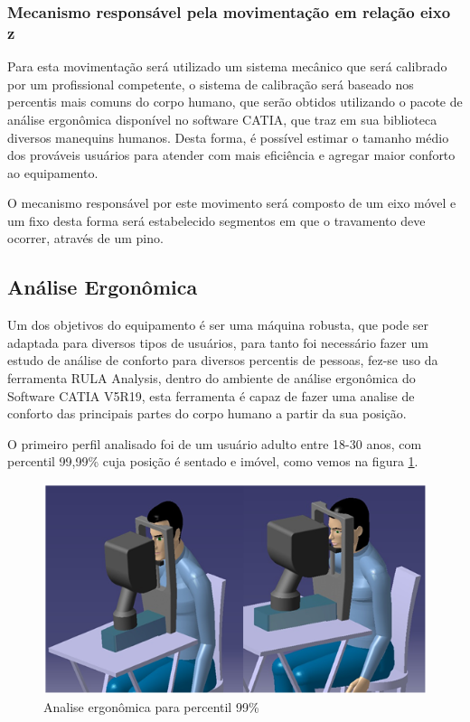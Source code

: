 \subsubsection[Mecanismo responsável pela movimentação em relação eixo z]{Mecanismo responsável pela movimentação em relação eixo z}

Para esta movimentação será utilizado um sistema mecânico que será calibrado por um profissional competente, o sistema de calibração será baseado nos percentis mais comuns do corpo humano, que serão obtidos utilizando o pacote de análise ergonômica disponível no software CATIA, que traz em sua biblioteca diversos manequins humanos. Desta forma, é possível estimar o tamanho médio dos prováveis usuários para atender com mais eficiência e agregar maior conforto ao equipamento.

O mecanismo responsável por este movimento será composto de um eixo móvel e um fixo desta forma será estabelecido segmentos em que o travamento deve ocorrer, através de um pino.



\subsection[Análise Ergonômica]{Análise Ergonômica}

Um dos objetivos do equipamento é ser uma máquina robusta, que pode ser adaptada para diversos tipos de usuários, para tanto foi necessário fazer um estudo de análise de conforto para diversos percentis de pessoas, fez-se uso da ferramenta RULA Analysis, dentro do ambiente de análise ergonômica do Software CATIA V5R19, esta ferramenta é capaz de fazer uma analise de conforto das principais partes do corpo humano a partir da sua posição.  

O primeiro perfil analisado foi de um usuário adulto entre 18-30 anos, com percentil 99,99\% cuja posição é sentado e imóvel, como vemos na figura \ref{adulto}.

\begin{figure}[H]
		\centering
			\includegraphics[scale=1.0]{figuras/adulto.png}
		\caption{Analise ergonômica para percentil 99\%}
		\label{adulto}
\end{figure}

